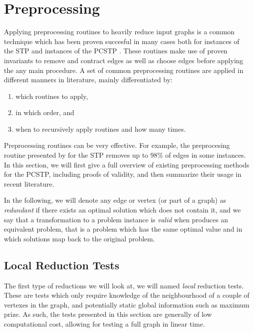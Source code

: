  \section{Preprocessing}
 \label{sec:solving:pre}
Applying preprocessing routines to heavily reduce input graphs is a common technique which has been proven succesful in many cases both for instances of the STP
\citep{koch1998solving}
and instances of the PCSTP
\citep{lucena2004strong,canuto2001local,ljubic2005solving, gamrath2017scip}. %
These routines make use of proven invariants to remove and contract edges as well as choose edges before applying the any main procedure.
A set of common preprocessing routines are applied in different manners in literature, mainly differentiated by:
\begin{enumerate}[label=\alph*)]
\item which routines to apply,
\item in which order, and
\item when to recursively apply routines and how many times.
\end{enumerate}
Preprocessing routines can be very effective. For example, the preprocesing routine presented by \cite{koch1998solving} for the STP removes
up to 98\% of edges in some instances. In this section, we will first give a full overview of existing preprocessing methods for the PCSTP,
 including proofs of validity,
 and then summarize their usage in recent literature.

 In the following, we will denote any edge or vertex (or part of a graph) as \textit{redundant} if there exists an optimal solution
  which does not contain it, and we say that a 
  transformation to a problem instance is \textit{valid} when produces an equivalent problem, that is a problem which has the same optimal
  value and in which solutions map back to the original problem.

 \subsection{Local Reduction Tests}\label{sec:pre:local}
 The first type of reductions we will look at, we will named \textit{local} reduction tests. These are tests which only require knowledge
 of the neighbourhood of a couple of vertexes in the graph, and potentially static global information
 such as maximum prize. As such, the tests
 presented in this section are generally of low computational cost, allowing for testing a full graph in linear time.

